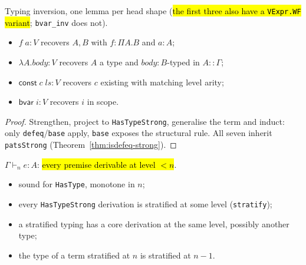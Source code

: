 \begin{theorem}
\label{fam:strong-inversions}
\leanok
{}

 Typing inversion, one lemma per head shape (\hl{the first three also have a
\texttt{VExpr.WF} variant}; \texttt{bvar\_inv} does not).
\begin{itemize}
\item $f\;a:V$ recovers $A,B$ with $f:\Pi A.B$ and $a:A$;
\item $\lambda A.body:V$ recovers $A$ a type and $body:B$-typed in $A::\Gamma$;
\item $\mathsf{const}\;c\;ls:V$ recovers $c$ existing with matching level arity;
\item $\mathsf{bvar}\;i:V$ recovers $i$ in scope.
\end{itemize}
\end{theorem}
\begin{proof}
\leanok
{} Strengthen, project to \texttt{HasTypeStrong}, generalise the term and induct: only
\texttt{defeq}/\texttt{base} apply, \texttt{base} exposes the structural rule.
 All seven inherit \stSorry{} \texttt{patsStrong} (Theorem~\ref{thm:isdefeq-strong}).
\end{proof}

\begin{definition}
\label{def:hastypestratified}
\leanok
{}

 $\Gamma\vdash_n e:A$: \hl{every premise derivable at level $<n$}.
\begin{itemize}
\item sound for \texttt{HasType}, monotone in $n$;
\item every \texttt{HasTypeStrong} derivation is stratified at some level (\texttt{stratify});
\item a stratified typing has a core derivation at the same level, possibly another type;
\item the type of a term stratified at $n$ is stratified at $n-1$.
\end{itemize}
\end{definition}

